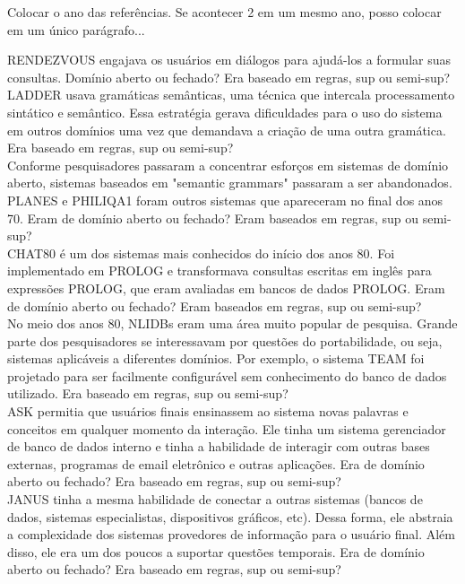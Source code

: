 \documentclass{article}
\begin{document}
Colocar o ano das referências. Se acontecer 2 em um mesmo ano, posso colocar em um único parágrafo...

RENDEZVOUS \citep{codd1974seven} engajava os usuários em diálogos para ajudá-los a formular suas consultas. Domínio aberto ou fechado? Era baseado em regras, sup ou semi-sup?\\

LADDER \citep{hendrix1978developing} usava gramáticas semânticas, uma técnica que intercala processamento sintático e semântico. Essa estratégia gerava dificuldades para o uso do sistema em outros domínios uma vez que demandava a criação de uma outra gramática. Era baseado em regras, sup ou semi-sup?\\

Conforme pesquisadores passaram a concentrar esforços em sistemas de domínio aberto, sistemas baseados em "semantic grammars" passaram a ser abandonados. PLANES \citep{waltz1978english} e PHILIQA1 \citep{scha1977philips} foram outros sistemas que apareceram no final dos anos 70. Eram de domínio aberto ou fechado? Eram baseados em regras, sup ou semi-sup?\\

CHAT80 \citep{warren1982efficient} é um dos sistemas mais conhecidos do início dos anos 80. Foi implementado em PROLOG e transformava consultas escritas em inglês para expressões PROLOG, que eram avaliadas em bancos de dados PROLOG. Eram de domínio aberto ou fechado? Eram baseados em regras, sup ou semi-sup?\\

No meio dos anos 80, NLIDBs eram uma área muito popular de pesquisa. Grande parte dos pesquisadores se interessavam por questões do portabilidade, ou seja, sistemas aplicáveis a diferentes domínios. Por exemplo, o sistema TEAM \citep{grosz1983team} foi projetado para ser facilmente configurável sem conhecimento do banco de dados utilizado. Era baseado em regras, sup ou semi-sup?\\

ASK \citep{thompson1983introducing} permitia que usuários finais ensinassem ao sistema novas palavras e conceitos em qualquer momento da interação. Ele tinha um sistema gerenciador de banco de dados interno e tinha a habilidade de interagir com outras bases externas, programas de email eletrônico e outras aplicações. Era de domínio aberto ou fechado? Era baseado em regras, sup ou semi-sup?\\

JANUS \citep{hinrichs1988tense} tinha a mesma habilidade de conectar a outras sistemas (bancos de dados, sistemas especialistas, dispositivos gráficos, etc). Dessa forma, ele abstraia a complexidade dos sistemas provedores de informação para o usuário final. Além disso, ele era um dos poucos a suportar questões temporais. Era de domínio aberto ou fechado? Era baseado em regras, sup ou semi-sup?\\
\end{document}
